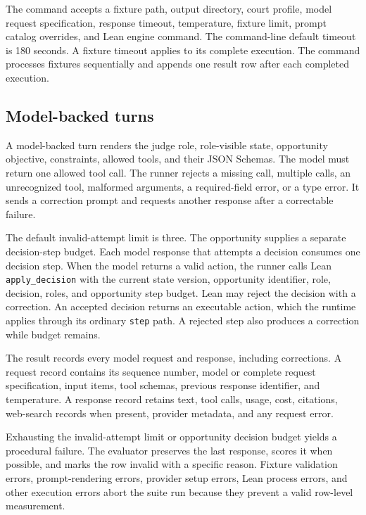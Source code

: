 \documentclass[11pt]{article}
\newcommand{\code}[1]{\texttt{#1}}
\begin{document}
The command accepts a fixture path, output directory, court profile, model request specification, response timeout, temperature, fixture limit, prompt catalog overrides, and Lean engine command.  The command-line default timeout is 180 seconds.  A fixture timeout applies to its complete execution.  The command processes fixtures sequentially and appends one result row after each completed execution.

\subsection{Model-backed turns}

A model-backed turn renders the judge role, role-visible state, opportunity objective, constraints, allowed tools, and their JSON Schemas.  The model must return one allowed tool call.  The runner rejects a missing call, multiple calls, an unrecognized tool, malformed arguments, a required-field error, or a type error.  It sends a correction prompt and requests another response after a correctable failure.

The default invalid-attempt limit is three.  The opportunity supplies a separate decision-step budget.  Each model response that attempts a decision consumes one decision step.  When the model returns a valid action, the runner calls Lean \code{apply\_decision} with the current state version, opportunity identifier, role, decision, roles, and opportunity step budget.  Lean may reject the decision with a correction.  An accepted decision returns an executable action, which the runtime applies through its ordinary \code{step} path.  A rejected step also produces a correction while budget remains.

The result records every model request and response, including corrections.  A request record contains its sequence number, model or complete request specification, input items, tool schemas, previous response identifier, and temperature.  A response record retains text, tool calls, usage, cost, citations, web-search records when present, provider metadata, and any request error.

Exhausting the invalid-attempt limit or opportunity decision budget yields a procedural failure.  The evaluator preserves the last response, scores it when possible, and marks the row invalid with a specific reason.  Fixture validation errors, prompt-rendering errors, provider setup errors, Lean process errors, and other execution errors abort the suite run because they prevent a valid row-level measurement.
\end{document}
